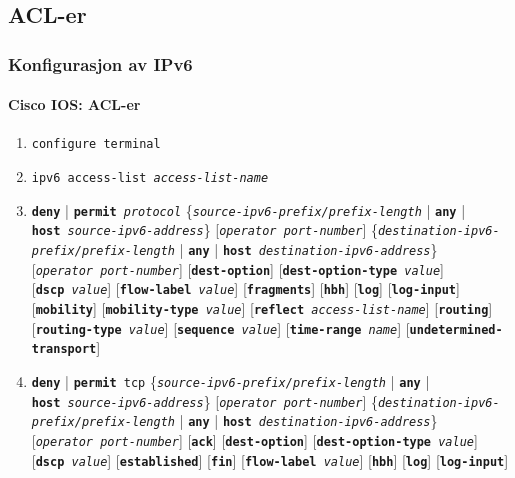 \subsection{ACL-er}
\begin{frame}[allowframebreaks]
  \frametitle{Konfigurasjon av IPv6}
  \framesubtitle{Cisco IOS: ACL-er}
  \begin{enumerate}
  \item \texttt{configure terminal}
  \item \texttt{ipv6 access-list \textit{access-list-name}}
  \item \texttt{\textbf{deny}} | \texttt{\textbf{permit}
      \textit{protocol}}
    \{\texttt{\textit{source-ipv6-prefix/prefix-length}} |
    \texttt{\textbf{any}} |
    \texttt{\textbf{host}~\textit{source-ipv6-address}}\}
    [\texttt{\textit{operator~port-number}}]
    \{\texttt{\textit{destination-ipv6-prefix/prefix-length}} |
    \texttt{\textbf{any}} |
    \texttt{\textbf{host}~\textit{destination-ipv6-address}}\}
    [\texttt{\textit{operator~port-number}}]
    [\texttt{\textbf{dest-option}}]
    [\texttt{\textbf{dest-option-type}~\textit{value}}]
    [\texttt{\textbf{dscp}~\textit{value}}]
    [\texttt{\textbf{flow-label}~\textit{value}}]
    [\texttt{\textbf{fragments}}]
    [\texttt{\textbf{hbh}}]
    [\texttt{\textbf{log}}]
    [\texttt{\textbf{log-input}}]
    [\texttt{\textbf{mobility}}]
    [\texttt{\textbf{mobility-type}~\textit{value}}]
    [\texttt{\textbf{reflect}~\textit{access-list-name}}]
    [\texttt{\textbf{routing}}]
    [\texttt{\textbf{routing-type}~\textit{value}}]
    [\texttt{\textbf{sequence}~\textit{value}}]
    [\texttt{\textbf{time-range}~\textit{name}}]
    [\texttt{\textbf{undetermined-transport}}]
  \item \texttt{\textbf{deny}} | \texttt{\textbf{permit} tcp}
    \{\texttt{\textit{source-ipv6-prefix/prefix-length}} |
    \texttt{\textbf{any}} |
    \texttt{\textbf{host}~\textit{source-ipv6-address}}\}
    [\texttt{\textit{operator~port-number}}]
    \{\texttt{\textit{destination-ipv6-prefix/prefix-length}} |
    \texttt{\textbf{any}} |
    \texttt{\textbf{host}~\textit{destination-ipv6-address}}\}
    [\texttt{\textit{operator~port-number}}]
    [\texttt{\textbf{ack}}]
    [\texttt{\textbf{dest-option}}]
    [\texttt{\textbf{dest-option-type}~\textit{value}}]
    [\texttt{\textbf{dscp}~\textit{value}}]
    [\texttt{\textbf{established}}]
    [\texttt{\textbf{fin}}]
    [\texttt{\textbf{flow-label}~\textit{value}}]
    [\texttt{\textbf{hbh}}]
    [\texttt{\textbf{log}}]
    [\texttt{\textbf{log-input}}]

\end{enumerate}
\end{frame}
